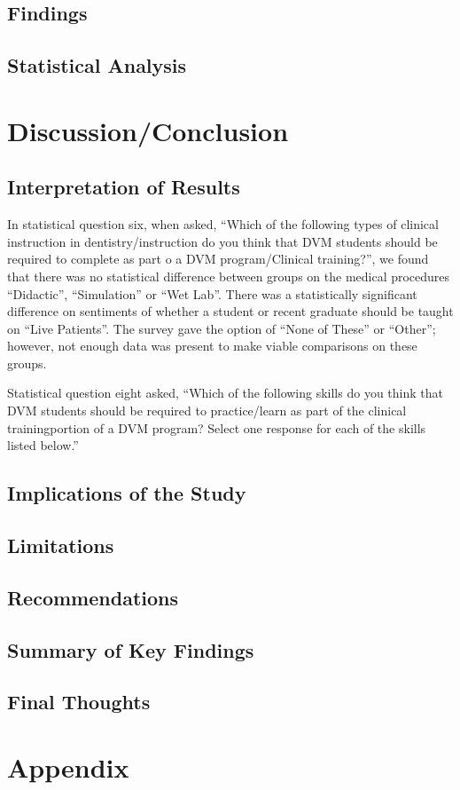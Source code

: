 \documentclass[
  11pt,
  letterpaper,
  DIV=11,
  numbers=noendperiod]{scrartcl}
\numberwithin{figure}{section}
\begin{document}
\subsection{Findings}\label{findings}

\subsection{Statistical Analysis}\label{statistical-analysis}

\section{Discussion/Conclusion}\label{discussionconclusion}

\subsection{Interpretation of Results}\label{interpretation-of-results}

In statistical question six, when asked, ``Which of the following types
of clinical instruction in dentistry/instruction do you think that DVM
students should be required to complete as part o a DVM program/Clinical
training?'', we found that there was no statistical difference between
groups on the medical procedures ``Didactic'', ``Simulation'' or ``Wet
Lab''. There was a statistically significant difference on sentiments of
whether a student or recent graduate should be taught on ``Live
Patients''. The survey gave the option of ``None of These'' or
``Other''; however, not enough data was present to make viable
comparisons on these groups.

Statistical question eight asked, ``Which of the following skills do you
think that DVM students should be required to practice/learn as part of
the clinical trainingportion of a DVM program? Select one response for
each of the skills listed below.''

\subsection{Implications of the Study}\label{implications-of-the-study}

\subsection{Limitations}\label{limitations}

\subsection{Recommendations}\label{recommendations}

\subsection{Summary of Key Findings}\label{summary-of-key-findings}

\subsection{Final Thoughts}\label{final-thoughts}

\section{Appendix}\label{appendix}
\end{document}
